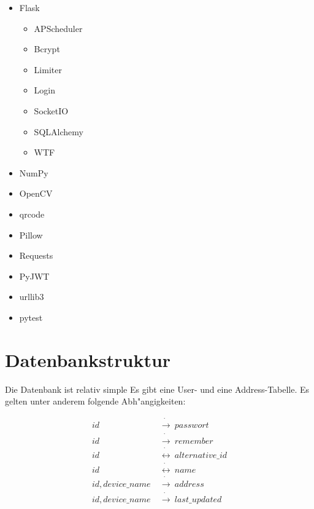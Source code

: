 \begin{samepage}
    \begin{itemize}
        \setlength\itemsep{-0.4em}
        \item Flask
        \begin{itemize}
            \setlength\itemsep{-0.4em}
            \item APScheduler
            \item Bcrypt
            \item Limiter
            \item Login
            \item SocketIO
            \item SQLAlchemy
            \item WTF
        \end{itemize}
        \item NumPy
        \item OpenCV
        \item qrcode
        \item Pillow
        \item Requests
        \item PyJWT
        \item urllib3
        \item pytest
    \end{itemize}
\end{samepage}

\section{Datenbankstruktur}\label{sec:datenbankstruktur}
Die Datenbank ist relativ simple
Es gibt eine User- und eine Address-Tabelle.
Es gelten unter anderem folgende Abh{"a}ngigkeiten:

\begin{align}
    id ~ &\dot \rightarrow ~ passwort \\
    id ~ &\dot \rightarrow ~ remember \\
    id ~ &\dot \leftrightarrow ~ alternative\_id \\
    id ~ &\dot \leftrightarrow ~ name \\
    id, device\_name ~ &\dot \rightarrow ~ address \\
    id, device\_name ~ &\dot \rightarrow ~ last\_updated
\end{align}

